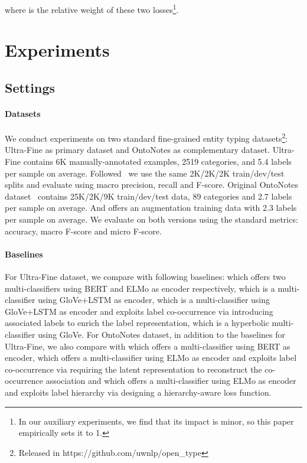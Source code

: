 \documentclass[11pt]{article}
\begin{document}
where  is the relative weight of these two losses\footnote{ In our auxiliary experiments, we find that its impact is minor, so this paper empirically sets it to 1.}.
\section{Experiments}
\subsection{Settings}
\paragraph{Datasets} We conduct experiments on two standard fine-grained entity typing datasets\footnote{Released in https://github.com/uwnlp/open\_type}: Ultra-Fine as primary dataset and OntoNotes as complementary dataset. Ultra-Fine contains 6K manually-annotated examples, 2519 categories, and 5.4 labels per sample on average. Followed~\citet{choi2018ultra_data1} we use the same 2K/2K/2K train/dev/test splits and evaluate using macro precision, recall and F-score. Original OntoNotes dataset~\citep{ontonotes_data2} contains 25K/2K/9K train/dev/test data, 89 categories and 2.7 labels per sample on average. And \citet{choi2018ultra_data1} offers an augmentation training data with 2.3 labels per sample on average. We evaluate on both versions using the standard metrics: accuracy, macro F-score and micro F-score.
\paragraph{Baselines} For Ultra-Fine dataset, we compare with following baselines: \citet{DBLP:conf/naacl/OnoeD19_elmo} which offers two multi-classifiers using BERT and ELMo as encoder respectively, \citet{choi2018ultra_data1} which is a multi-classifier using GloVe+LSTM as encoder, \citet{xiong2019imposing_core2} which is a multi-classifier using GloVe+LSTM as encoder and exploits label co-occurrence via introducing associated labels to enrich the label representation, \citet{DBLP:conf/emnlp/Lopez020_hyper} which is a hyperbolic multi-classifier using GloVe. For OntoNotes dataset, in addition to the baselines for Ultra-Fine, we also compare with \citet{wang2020empirical} which offers a multi-classifier using BERT as encoder, \citet{linandJi2019attentive_core3} which offers a multi-classifier using ELMo as encoder and exploits label co-occurrence via requiring the latent representation to reconstruct the co-occurrence association and \citet{DBLP:conf/acl/ChenCD20_onto_hier4} which offers a multi-classifier using ELMo as encoder and exploits label hierarchy via designing a hierarchy-aware loss function.
\end{document}
